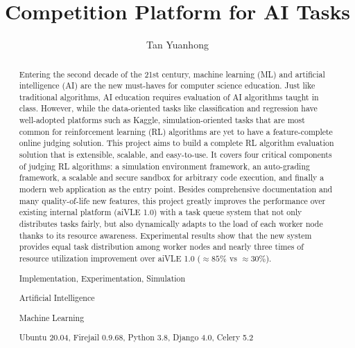 \documentclass[fyp]{socreport}
\begin{document}
\title{Competition Platform for AI Tasks}
\author{Tan Yuanhong}
\maketitle
\begin{abstract}
Entering the second decade of the 21st century, machine learning (ML) and artificial intelligence (AI) are the new must-haves for computer science education. Just like traditional algorithms, AI education requires evaluation of AI algorithms taught in class. However, while the data-oriented tasks like classification and regression have well-adopted platforms such as Kaggle, simulation-oriented tasks that are most common for reinforcement learning (RL) algorithms are yet to have a feature-complete online judging solution. This project aims to build a complete RL algorithm evaluation solution that is extensible, scalable, and easy-to-use. It covers four critical components of judging RL algorithms: a simulation environment framework, an auto-grading framework, a scalable and secure sandbox for arbitrary code execution, and finally a modern web application as the entry point. Besides comprehensive documentation and many quality-of-life new features, this project greatly improves the performance over existing internal platform (aiVLE 1.0) with a task queue system that not only distributes tasks fairly, but also dynamically adapts to the load of each worker node thanks to its resource awareness. Experimental results show that the new system provides equal task distribution among worker nodes and nearly three times of resource utilization improvement over aiVLE 1.0 ($\approx 85\%$ vs $\approx 30\%$).

\begin{project-nature}
	Implementation, Experimentation, Simulation
\end{project-nature}
\begin{keywords}
    \item Artificial Intelligence
	\item Machine Learning
\end{keywords}
\begin{implement}
	Ubuntu 20.04, Firejail 0.9.68, Python 3.8, Django 4.0, Celery 5.2
\end{implement}

\end{abstract}
\end{document}
